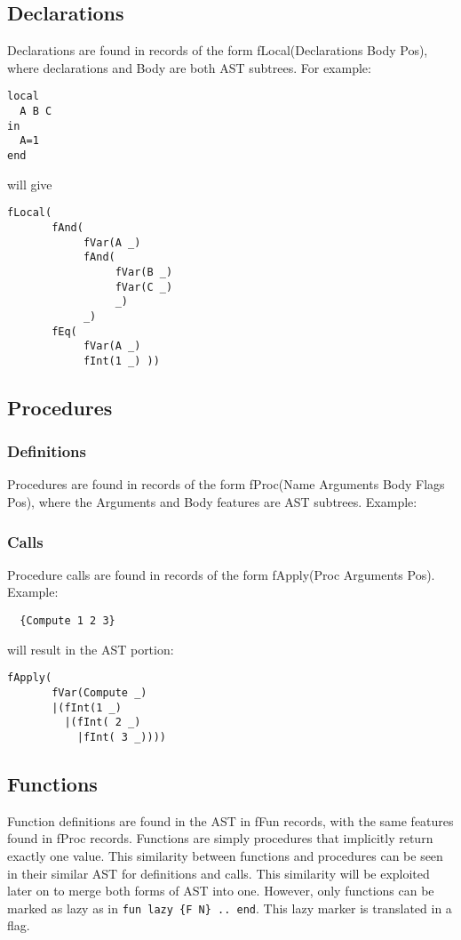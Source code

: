 \documentclass[a4paper]{memoir}
\begin{document}
\subsection{Declarations}\label{sec:input:flocal}
Declarations are found in records of the form fLocal(Declarations Body Pos), where declarations and Body are both AST subtrees. 
For example:

\begin{lstlisting}
local
  A B C
in
  A=1
end
\end{lstlisting}
will give
\begin{verbatim}
fLocal(
       fAnd(
            fVar(A _) 
            fAnd(
                 fVar(B _) 
                 fVar(C _) 
                 _) 
            _) 
       fEq( 
            fVar(A _) 
            fInt(1 _) ))
\end{verbatim}

\subsection{Procedures}\label{sec:input:procedures}
\subsubsection{Definitions}
Procedures are found in records of the form fProc(Name Arguments Body Flags Pos), where the Arguments and Body features are AST subtrees. %
Example:

\subsubsection{Calls}
Procedure calls are found in records of the form fApply(Proc Arguments Pos). 
Example:

\begin{lstlisting}
  {Compute 1 2 3}
\end{lstlisting}

will result in the AST portion:
\begin{verbatim}
fApply(
       fVar(Compute _)
       |(fInt(1 _)
         |(fInt( 2 _)
           |fInt( 3 _))))
\end{verbatim}

\subsection{Functions}\label{sec:input:functions}
Function definitions are found in the AST in fFun records, with the same features found in fProc records. Functions are simply procedures that implicitly return exactly one value. This similarity between functions and procedures can be seen in their similar AST for definitions and calls. This similarity will be exploited later on to merge both forms of AST into one.
However, only functions can be marked as lazy as in \lstinline!fun lazy {F N} .. end!. This lazy marker is translated in a flag.
\end{document}
